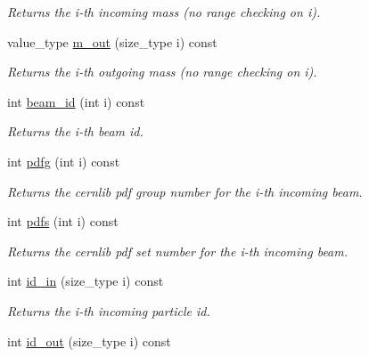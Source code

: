 \begin{DoxyCompactItemize}
\begin{DoxyCompactList}\small\item\em Returns the i-\/th incoming mass (no range checking on i). \end{DoxyCompactList}\item 
\hypertarget{a00430_a0764bde067cdc21b0aa2ca0d8318c008}{value\-\_\-type \hyperlink{a00430_a0764bde067cdc21b0aa2ca0d8318c008}{m\-\_\-out} (size\-\_\-type i) const }\label{a00430_a0764bde067cdc21b0aa2ca0d8318c008}

\begin{DoxyCompactList}\small\item\em Returns the i-\/th outgoing mass (no range checking on i). \end{DoxyCompactList}\item 
\hypertarget{a00430_a6841f702b3f6461196ac7bf89c047ab8}{int \hyperlink{a00430_a6841f702b3f6461196ac7bf89c047ab8}{beam\-\_\-id} (int i) const }\label{a00430_a6841f702b3f6461196ac7bf89c047ab8}

\begin{DoxyCompactList}\small\item\em Returns the i-\/th beam id. \end{DoxyCompactList}\item 
\hypertarget{a00430_a23df6b1572d4be25d5ee1dc86d0700ac}{int \hyperlink{a00430_a23df6b1572d4be25d5ee1dc86d0700ac}{pdfg} (int i) const }\label{a00430_a23df6b1572d4be25d5ee1dc86d0700ac}

\begin{DoxyCompactList}\small\item\em Returns the cernlib pdf group number for the i-\/th incoming beam. \end{DoxyCompactList}\item 
\hypertarget{a00430_a62e1c791346f96085c141a54097cfbf5}{int \hyperlink{a00430_a62e1c791346f96085c141a54097cfbf5}{pdfs} (int i) const }\label{a00430_a62e1c791346f96085c141a54097cfbf5}

\begin{DoxyCompactList}\small\item\em Returns the cernlib pdf set number for the i-\/th incoming beam. \end{DoxyCompactList}\item 
\hypertarget{a00430_ac449cf781eb308c647407c1b5d02dbf4}{int \hyperlink{a00430_ac449cf781eb308c647407c1b5d02dbf4}{id\-\_\-in} (size\-\_\-type i) const }\label{a00430_ac449cf781eb308c647407c1b5d02dbf4}

\begin{DoxyCompactList}\small\item\em Returns the i-\/th incoming particle id. \end{DoxyCompactList}\item 
\hypertarget{a00430_a299283bf13ddd94d965b46b97da53453}{int \hyperlink{a00430_a299283bf13ddd94d965b46b97da53453}{id\-\_\-out} (size\-\_\-type i) const }\label{a00430_a299283bf13ddd94d965b46b97da53453}


\end{DoxyCompactItemize}
